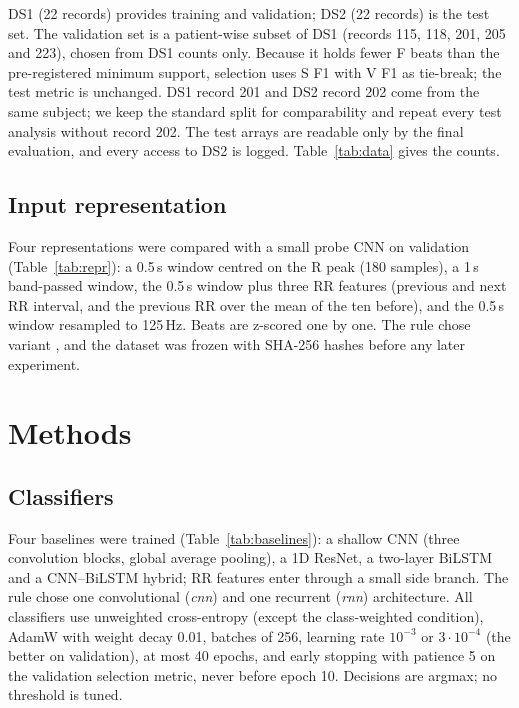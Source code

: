 \documentclass[11pt]{article}
\begin{document}
DS1 (22 records) provides training and validation; DS2 (22 records) is the test set. The validation set is a
patient-wise subset of DS1 (records 115, 118, 201, 205 and 223), chosen from DS1 counts only. Because it holds
fewer F beats than the pre-registered minimum support, selection uses S F1 with V F1 as tie-break; the test
metric is unchanged. DS1 record 201 and DS2 record 202 come from the same subject; we keep the standard split
for comparability and repeat every test analysis without record 202. The test arrays are readable only by the
final evaluation, and every access to DS2 is logged. Table~\ref{tab:data} gives the counts.
\begin{table}[htbp]\centering\small\caption{Records and beats per split.}\label{tab:data}\end{table}

\subsection{Input representation}
Four representations were compared with a small probe CNN on validation (Table~\ref{tab:repr}): a 0.5\,s window
centred on the R peak (180 samples), a 1\,s band-passed window, the 0.5\,s window plus three RR features
(previous and next RR interval, and the previous RR over the mean of the ten before), and the 0.5\,s window
resampled to 125\,Hz. Beats are z-scored one by one. The rule chose variant \PhaseOneWinner, and the dataset was
frozen with SHA-256 hashes before any later experiment.
\begin{table}[htbp]\centering\small{}\caption{Input representations (validation, probe CNN).}\label{tab:repr}\end{table}

\section{Methods}
\subsection{Classifiers}
Four baselines were trained (Table~\ref{tab:baselines}): a shallow CNN (three convolution blocks, global average
pooling), a 1D ResNet, a two-layer BiLSTM and a CNN--BiLSTM hybrid; RR features enter through a small side
branch. The rule chose one convolutional (\emph{cnn}) and one recurrent (\emph{rnn}) architecture. All
classifiers use unweighted cross-entropy (except the class-weighted condition), AdamW with weight decay 0.01,
batches of 256, learning rate $10^{-3}$ or $3\cdot10^{-4}$ (the better on validation), at most 40 epochs, and
early stopping with patience 5 on the validation selection metric, never before epoch 10. Decisions are argmax;
no threshold is tuned.
\begin{table}[htbp]\centering\small{}\caption{Baseline classifiers (validation).}\label{tab:baselines}\end{table}
\end{document}
